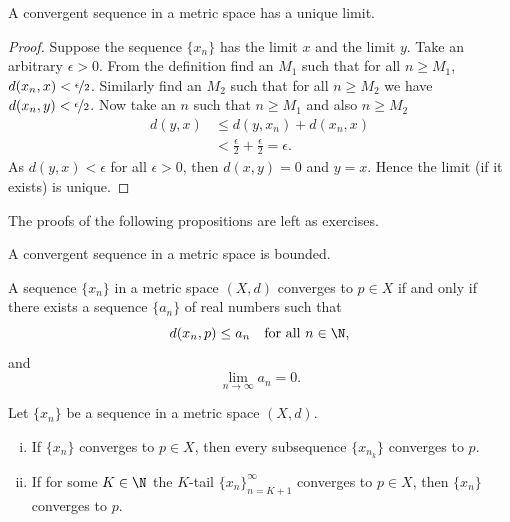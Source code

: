 \documentclass[12pt]{book}
\begin{document}
\begin{prop} \label{prop:mslimisunique}
A convergent sequence in a metric space has a unique limit.
\end{prop}

\begin{proof}
Suppose the sequence $\{ x_n \}$ has the limit $x$ and the limit $y$.
Take an arbitrary $\epsilon > 0$.
From the definition find an $M_1$ such that for all $n \geq M_1$,
$d(x_n,x) < \nicefrac{\epsilon}{2}$.
Similarly find an $M_2$
such that for all $n \geq M_2$ we have
$d(x_n,y) < \nicefrac{\epsilon}{2}$.
Now take an $n$ such that
$n \geq M_1$ and also $n \geq M_2$
\begin{equation*}
\begin{split}
d(y,x)
& \leq
d(y,x_n) + d(x_n,x) \\
& <
\frac{\epsilon}{2} + \frac{\epsilon}{2} = \epsilon .
\end{split}
\end{equation*}
As $d(y,x) < \epsilon$ for all $\epsilon > 0$, then $d(x,y) = 0$
and $y=x$.
Hence the limit (if it exists) is unique.
\end{proof}

The proofs of the following propositions are left as exercises.

\begin{prop} \label{prop:msconvbound}
A convergent sequence in a metric space is bounded.
\end{prop}

\begin{prop} \label{prop:msconvifa}
A sequence $\{ x_n \}$ in a metric space $(X,d)$ converges to $p \in X$
if and only
if there exists a sequence $\{ a_n \}$ of real numbers such that
\begin{equation*}
d(x_n,p) \leq a_n \quad \text{for all $n \in \N$},
\end{equation*}
and
\begin{equation*}
\lim_{n\to\infty} a_n = 0.
\end{equation*}
\end{prop}

\begin{prop} \label{prop:mssubseq}
Let $\{ x_n \}$ be a sequence in a metric space $(X,d)$.
\begin{enumerate}[(i)]
\item If $\{ x_n \}$ converges to $p \in X$, then every subsequence $\{ x_{n_k} \}$
converges to $p$.
\item If for some $K \in \N$ the $K$-tail $\{ x_n \}_{n=K+1}^\infty$
converges to $p \in X$, then
 $\{ x_n \}$ converges to $p$.
\end{enumerate}
\end{prop}
\end{document}
